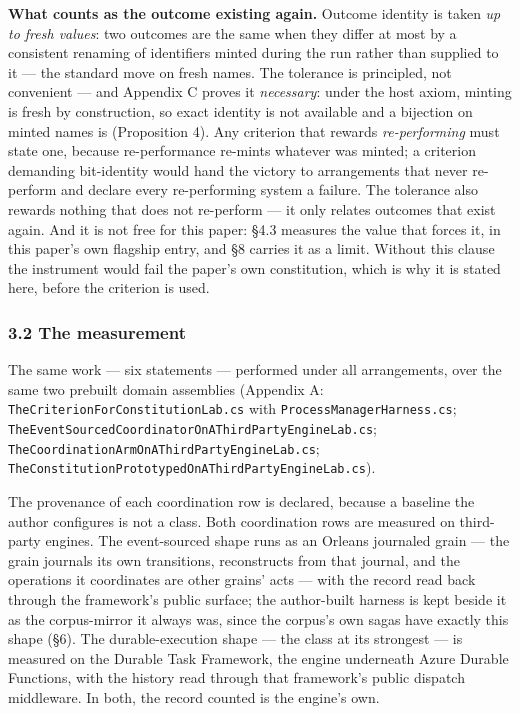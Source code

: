 \documentclass[
]{article}
\begin{document}
\textbf{What counts as the outcome existing again.} Outcome identity is
taken \emph{up to fresh values}: two outcomes are the same when they
differ at most by a consistent renaming of identifiers minted during the
run rather than supplied to it --- the standard move on fresh names. The
tolerance is principled, not convenient --- and Appendix C proves it
\emph{necessary}: under the host axiom, minting is fresh by
construction, so exact identity is not available and a bijection on
minted names is (Proposition 4). Any criterion that rewards
\emph{re-performing} must state one, because re-performance re-mints
whatever was minted; a criterion demanding bit-identity would hand the
victory to arrangements that never re-perform and declare every
re-performing system a failure. The tolerance also rewards nothing that
does not re-perform --- it only relates outcomes that exist again. And
it is not free for this paper: §4.3 measures the value that forces it,
in this paper's own flagship entry, and §8 carries it as a limit.
Without this clause the instrument would fail the paper's own
constitution, which is why it is stated here, before the criterion is
used.

\subsubsection{3.2 The measurement}\label{the-measurement}

The same work --- six statements --- performed under all arrangements,
over the same two prebuilt domain assemblies (Appendix A:
\texttt{TheCriterionForConstitutionLab.cs} with
\texttt{ProcessManagerHarness.cs};
\texttt{TheEventSourcedCoordinatorOnAThirdPartyEngineLab.cs};
\texttt{TheCoordinationArmOnAThirdPartyEngineLab.cs};
\texttt{TheConstitutionPrototypedOnAThirdPartyEngineLab.cs}).

The provenance of each coordination row is declared, because a baseline
the author configures is not a class. Both coordination rows are
measured on third-party engines. The event-sourced shape runs as an
Orleans journaled grain --- the grain journals its own transitions,
reconstructs from that journal, and the operations it coordinates are
other grains' acts --- with the record read back through the framework's
public surface; the author-built harness is kept beside it as the
corpus-mirror it always was, since the corpus's own sagas have exactly
this shape (§6). The durable-execution shape --- the class at its
strongest --- is measured on the Durable Task Framework, the engine
underneath Azure Durable Functions, with the history read through that
framework's public dispatch middleware. In both, the record counted is
the engine's own.
\end{document}
